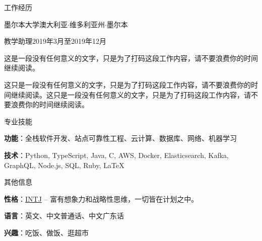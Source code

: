 \documentclass{xsha}
\begin{document}
\begin{xsection}{工作经历}
\begin{xheading}{墨尔本大学}{澳大利亚$\cdot$维多利亚州$\cdot$墨尔本}
\begin{xsubheading}{教学助理}{2019年3月至2019年12月}
\item 这是一段没有任何意义的文字，只是为了打码这段工作内容，请不要浪费你的时间继续阅读。
\item 这只是一段没有任何意义的文字，只是为了打码这段工作内容，请不要浪费你的时间继续阅读。这只是一段没有任何意义的文字，只是为了打码这段工作内容，请不要浪费你的时间继续阅读。
\end{xsubheading}
\end{xheading}

\end{xsection}

\begin{xsection}{专业技能}
\item \textbf{功能}：全栈软件开发、站点可靠性工程、云计算、数据库、网络、机器学习
\item \textbf{技术}：Python, TypeScript, Java, C, AWS, Docker, Elasticsearch, Kafka, GraphQL, Node.js, SQL, Ruby, \LaTeX
\end{xsection}

\begin{xsection}{其他信息}
\item \textbf{性格}：\href{https://www.16personalities.com/intj-personality}{INTJ} -- 富有想象力和战略性思维，一切皆在计划之中。
\item \textbf{语言}：英文、中文普通话、中文广东话
\item \textbf{兴趣}：吃饭、做饭、逛超市
\end{xsection}
\end{document}
